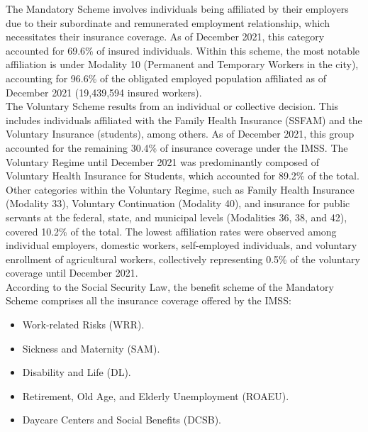 \documentclass[10pt, oneside]{book}
\begin{document}
The Mandatory Scheme involves individuals being affiliated by their employers due to their subordinate and remunerated employment relationship, which necessitates their insurance coverage. As of December 2021, this category accounted for 69.6\% of insured individuals.  Within this scheme, the most notable affiliation is under Modality 10 (Permanent and Temporary Workers in the city), accounting for 96.6\% of the obligated employed population affiliated as of December 2021 (19,439,594 insured workers). \\

The Voluntary Scheme results from an individual or collective decision. This includes individuals affiliated with the Family Health Insurance (SSFAM) and the Voluntary Insurance (students), among others. As of December 2021, this group accounted for the remaining 30.4\% of insurance coverage under the IMSS. The Voluntary Regime until December 2021 was predominantly composed of Voluntary Health Insurance for Students, which accounted for 89.2\% of the total. Other categories within the Voluntary Regime, such as Family Health Insurance (Modality 33), Voluntary Continuation (Modality 40), and insurance for public servants at the federal, state, and municipal levels (Modalities 36, 38, and 42), covered 10.2\% of the total. The lowest affiliation rates were observed among individual employers, domestic workers, self-employed individuals, and voluntary enrollment of agricultural workers, collectively representing 0.5\% of the voluntary coverage until December 2021. \\

According to the Social Security Law, the benefit scheme of the Mandatory Scheme comprises all the insurance coverage offered by the IMSS:

\begin{itemize}
    \item Work-related Risks (WRR).
    \item Sickness and Maternity (SAM).
    \item Disability and Life (DL).
    \item Retirement, Old Age, and Elderly Unemployment (ROAEU).
    \item Daycare Centers and Social Benefits (DCSB). 
\end{itemize}
\end{document}

